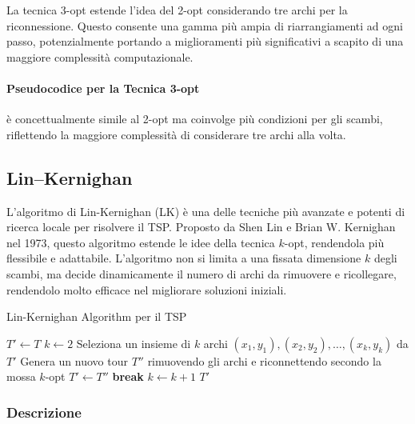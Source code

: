 La tecnica 3-opt estende l'idea del 2-opt considerando tre archi per la riconnessione. Questo consente una gamma più ampia di riarrangiamenti ad ogni passo, potenzialmente portando a miglioramenti più significativi a scapito di una maggiore complessità computazionale.

\paragraph{Pseudocodice per la Tecnica 3-opt} è concettualmente simile al 2-opt ma coinvolge più condizioni per gli scambi, riflettendo la maggiore complessità di considerare tre archi alla volta.

\subsection{Lin–Kernighan}

L'algoritmo di Lin-Kernighan (\Gls{LK}) è una delle tecniche più avanzate e potenti di ricerca locale per risolvere il \Gls{TSP}. Proposto da Shen Lin e Brian W. Kernighan nel 1973, questo algoritmo estende le idee della tecnica \(k\)-opt, rendendola più flessibile e adattabile. L'algoritmo non si limita a una fissata dimensione \(k\) degli scambi, ma decide dinamicamente il numero di archi da rimuovere e ricollegare, rendendolo molto efficace nel migliorare soluzioni iniziali.\cite{lin1973effective}


\begin{algorithm}
	\caption{Lin-Kernighan Algorithm per il \Gls{TSP}}\label{alg:lin-kernighan}
	\begin{algorithmic}[1]
		 
		\State $T' \gets T$ 
		\Repeat
		\State $k \gets 2$
		\Repeat
		\State Seleziona un insieme di $k$ archi $(x_1, y_1), (x_2, y_2), \ldots, (x_k, y_k)$ da $T'$
		\State Genera un nuovo tour $T''$ rimuovendo gli archi e riconnettendo secondo la mossa $k$-opt
		\State $T' \gets T''$
		\State \textbf{break} 
		\EndIf
		\State $k \gets k + 1$
		\EndFor
		\State \Return $T'$
		\EndProcedure
	\end{algorithmic}
\end{algorithm}
\subsubsection{Descrizione}

